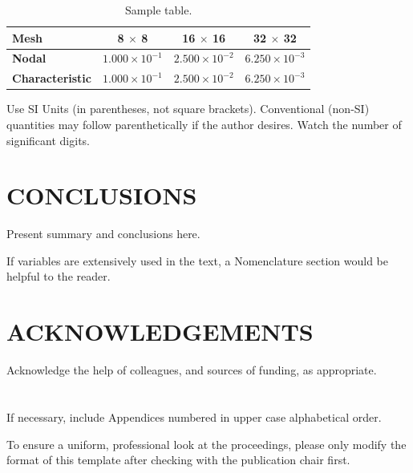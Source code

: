 \documentclass[letterpaper]{mc2025}
\begin{document}
\begin{table}[h!]
    \centering
    \caption{Sample table.}
    \begin{tabular}{|l|c|c|c|}
        \hline
         \textbf{Mesh}           & \textbf{8 $\times$ 8} & \textbf{16 $\times$ 16} & \textbf{32 $\times$ 32} \\ \hline
         \textbf{Nodal}          & $1.000\times 10^{-1}$ & $2.500\times 10^{-2}$ & $6.250\times 10^{-3}$ \\ \hline
         \textbf{Characteristic} & $1.000\times 10^{-1}$ & $2.500\times 10^{-2}$ & $6.250\times 10^{-3}$ \\ \hline
    \end{tabular}

    \label{tab:sample}
\end{table}

Use SI Units (in parentheses, not square brackets).  Conventional (non-SI) quantities may follow parenthetically if the author desires.  Watch the number of significant digits.

\section{CONCLUSIONS}
Present summary and conclusions here.

\printnomenclature
If variables are extensively used in the text, a Nomenclature section would be helpful to the reader.


\section*{ACKNOWLEDGEMENTS}
Acknowledge the help of colleagues, and sources of funding, as appropriate.





\appendix

\section{}
If necessary, include Appendices numbered in upper case alphabetical order.

To ensure a uniform, professional look at the proceedings, please only modify the format of this template after checking with the publication chair first.
\end{document}
